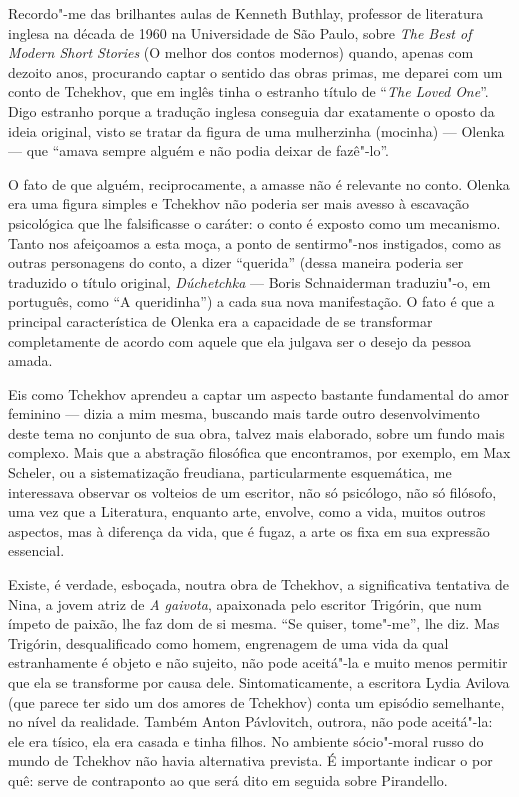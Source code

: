 Recordo"-me das brilhantes aulas de Kenneth Buthlay, professor de
literatura inglesa na década de 1960 na Universidade
de São Paulo, sobre \emph{The Best of Modern Short Stories} (O melhor dos
contos modernos) quando, apenas com dezoito anos, procurando captar o
sentido das obras primas, me deparei com um conto de Tchekhov, que em
inglês tinha o estranho título de ``\emph{The Loved One}''. Digo
estranho porque a tradução inglesa conseguia dar exatamente o oposto da
ideia original, visto se tratar da figura de uma mulherzinha (mocinha) ---
Olenka --- que ``amava sempre alguém e não podia deixar de fazê"-lo''.

O fato de que alguém, reciprocamente, a amasse não é relevante no conto.
Olenka era uma figura simples e Tchekhov não poderia ser mais avesso à
escavação psicológica que lhe falsificasse o caráter: o conto é exposto
como um mecanismo. Tanto nos afeiçoamos a esta moça, a ponto de
sentirmo"-nos instigados, como as outras personagens do conto, a dizer
``querida'' (dessa maneira poderia ser traduzido o título original,
\emph{Dúchetchka} --- Boris Schnaiderman traduziu"-o, em português, como ``A
queridinha'') a cada sua nova manifestação. O fato é que a principal
característica de Olenka era a capacidade de se transformar
completamente de acordo com aquele que ela julgava ser o desejo da
pessoa amada.

Eis como Tchekhov aprendeu a captar um aspecto bastante fundamental do
amor feminino --- dizia a mim mesma, buscando mais tarde outro
desenvolvimento deste tema no conjunto de sua obra, talvez mais
elaborado, sobre um fundo mais complexo. Mais que a abstração filosófica
que encontramos, por exemplo, em Max Scheler, ou a sistematização
freudiana, particularmente esquemática, me interessava observar os
volteios de um escritor, não só psicólogo, não só filósofo, uma vez que
a Literatura, enquanto arte, envolve, como a vida, muitos outros
aspectos, mas à diferença da vida, que é fugaz, a arte os fixa em sua
expressão essencial.

Existe, é verdade, esboçada, noutra obra de Tchekhov, a significativa
tentativa de Nina, a jovem atriz de \emph{A gaivota}, apaixonada pelo
escritor Trigórin, que num ímpeto de paixão, lhe faz dom de si mesma.
``Se quiser, tome"-me'', lhe diz. Mas Trigórin, desqualificado como
homem, engrenagem de uma vida da qual estranhamente é objeto e não
sujeito, não pode aceitá"-la e muito menos permitir que ela se transforme
por causa dele. Sintomaticamente, a escritora Lydia Avilova (que parece
ter sido um dos amores de Tchekhov) conta um episódio semelhante, no
nível da realidade. Também Anton Pávlovitch, outrora, não pode
aceitá"-la: ele era tísico, ela era casada e tinha filhos. No ambiente
sócio"-moral russo do mundo de Tchekhov não havia alternativa prevista. É
importante indicar o por quê: serve de contraponto ao que será dito em
seguida sobre Pirandello.

